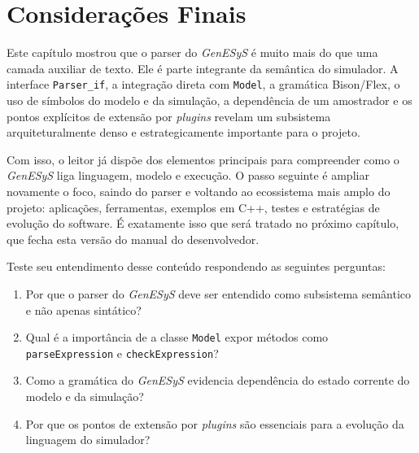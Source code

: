\section{Considerações Finais}
\label{sec:cap9_consideracoes_finais}

Este capítulo mostrou que o parser do \textit{GenESyS} é muito mais do que uma camada auxiliar de texto. Ele é parte integrante da semântica do simulador. A interface \texttt{Parser\_if}, a integração direta com \texttt{Model}, a gramática Bison/Flex, o uso de símbolos do modelo e da simulação, a dependência de um amostrador e os pontos explícitos de extensão por \textit{plugins} revelam um subsistema arquiteturalmente denso e estrategicamente importante para o projeto.

Com isso, o leitor já dispõe dos elementos principais para compreender como o \textit{GenESyS} liga linguagem, modelo e execução. O passo seguinte é ampliar novamente o foco, saindo do parser e voltando ao ecossistema mais amplo do projeto: aplicações, ferramentas, exemplos em C++, testes e estratégias de evolução do software. É exatamente isso que será tratado no próximo capítulo, que fecha esta versão do manual do desenvolvedor.

Teste seu entendimento desse conteúdo respondendo as seguintes perguntas:

\begin{enumerate}
    \item Por que o parser do \textit{GenESyS} deve ser entendido como subsistema semântico e não apenas sintático?

    \item Qual é a importância de a classe \texttt{Model} expor métodos como \texttt{parseExpression} e \texttt{checkExpression}?

    \item Como a gramática do \textit{GenESyS} evidencia dependência do estado corrente do modelo e da simulação?

    \item Por que os pontos de extensão por \textit{plugins} são essenciais para a evolução da linguagem do simulador?
\end{enumerate}